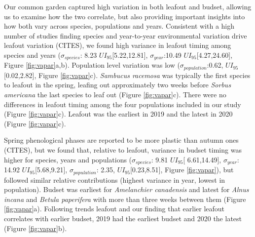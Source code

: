 \documentclass{article}[12pt]
\begin{document}
Our common garden captured high variation in both leafout and budset, allowing us to examine how the two correlate, but also providing important insights into how both vary across species, populations and years. Consistent with a high number of studies finding species and year-to-year environmental variation drive leafout variation (CITES), we found high variance in leafout timing among species and years ($\sigma_{species}$: 8.23 $UI_{95}$[5.22,12.81], $\sigma_{year}$:10.49 $UI_{95}$[4.27,24.60], Figure \ref{fig:vapar}a,b). Population level variation was low ($\sigma_{population}$:0.62, $UI_{95}$[0.02,2.82], Figure \ref{fig:vapar}c). \emph{Sambucus racemosa} was typically the first species to leafout in the spring, leafing out approximately two weeks before \emph{Sorbus americana} the last species to leaf out (Figure \ref{fig:vapar}c). There were no differences in leafout timing among the four populations included in our study (Figure \ref{fig:vapar}c). Leafout was the earliest in 2019 and the latest in 2020 (Figure \ref{fig:vapar}c). %

Spring phenological phases are reported to be more plastic than autumn ones (CITES), but we found that, relative to leafout, variance in budset timing was higher for species, years and populations ($\sigma_{species}$: 9.81 $UI_{95}$[ 6.61,14.49], $\sigma_{year}$: 14.92 $UI_{95}$[5.68,9.21], $\sigma_{population}$: 2.35, $UI_{95}$[0.23,8.51], Figure \ref{fig:vapar}), but followed similar relative contributions (highest variance in year, lowest in population). Budset was earliest for \emph{Amelanchier canadensis} and latest for \emph{Alnus incana} and \emph{Betula paperifera} with more than three weeks between them (Figure \ref{fig:vapar}a). Following trends leafout and our finding that earlier leafout correlates with earlier budset, 2019 had the earliest budset and 2020 the latest (Figure \ref{fig:vapar}b).
\end{document}
